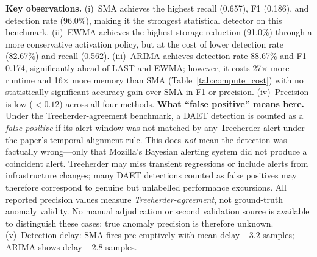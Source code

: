 \documentclass[a4paper,fleqn]{cas-sc}
\theoremstyle{plain}
\begin{document}
\begin{table}[tbp]
\centering
{}
\caption{Computational cost over 214 Mozilla Firefox-Android signatures
  for the four statistical detectors.
  All experiments were conducted on a CPU-only Windows workstation
  (Intel Core i7, 16\,GB RAM) running Python~3.12 with PyTorch~2.4.1+cpu;
  no GPU acceleration was used.
  Runtime is wall-clock time for the full 214-signature evaluation pass.
  Peak memory is the mean per-signature OS-reported peak RSS.
  ARIMA incurs a 27$\times$ runtime overhead and 16$\times$ memory overhead
  relative to SMA, with no statistically significant accuracy gain
  (Table~\ref{tab:wilcoxon}).}
\label{tab:compute_cost}
\end{table}

\textbf{Key observations.}
(i)~SMA achieves the highest recall (0.657), F1 (0.186), and detection rate (96.0\%),
making it the strongest statistical detector on this benchmark.
(ii)~EWMA achieves the highest storage reduction (91.0\%) through a more conservative
activation policy, but at the cost of lower detection rate (82.67\%) and recall (0.562).
(iii)~ARIMA achieves detection rate 88.67\% and F1 0.174, significantly ahead of
LAST and EWMA; however, it costs 27$\times$ more runtime and 16$\times$ more
memory than SMA (Table~\ref{tab:compute_cost}) with no statistically significant
accuracy gain over SMA in F1 or precision.
(iv)~Precision is low ($<0.12$) across all four methods.
\textbf{What ``false positive'' means here.}
Under the Treeherder-agreement benchmark, a DAET detection is counted as
a \emph{false positive} if its alert window was not matched by any
Treeherder alert under the paper's temporal alignment rule.
This does \emph{not} mean the detection was factually wrong---only that
Mozilla's Bayesian alerting system did not produce a coincident alert.
Treeherder may miss transient regressions or include alerts from
infrastructure changes; many DAET detections counted as false positives
may therefore correspond to genuine but unlabelled performance excursions.
All reported precision values measure \emph{Treeherder-agreement}, not
ground-truth anomaly validity.
No manual adjudication or second validation source is available to
distinguish these cases; true anomaly precision is therefore unknown.
(v)~Detection delay: SMA fires pre-emptively with mean delay $-3.2$ samples;
ARIMA shows delay $-2.8$ samples.
\end{document}
